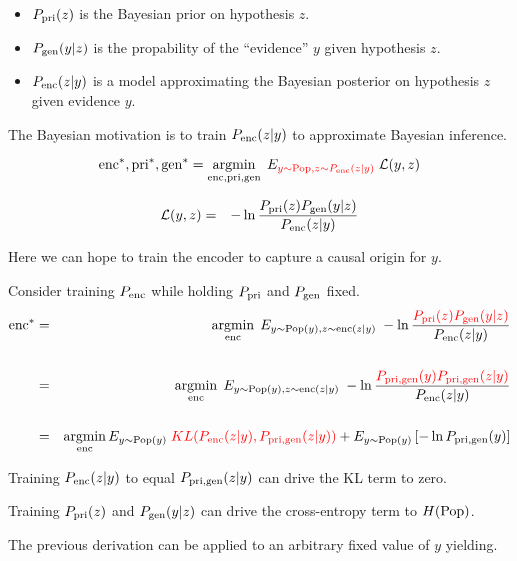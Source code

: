 {\vfill
\begin{itemize}
\item $P_{\mathrm{pri}}(z)$ is the Bayesian prior on hypothesis $z$.

\vfill
\item $P_{\mathrm{gen}}(y|z)$ is the propability of the ``evidence'' $y$ given hypothesis $z$.

\vfill
\item $P_{\mathrm{enc}}(z|y)$ is a model approximating the Bayesian posterior on hypothesis $z$ given evidence $y$.
\end{itemize}

\vfill
The Bayesian motivation is to train $P_{\mathrm{enc}}(z|y)$ to approximate Bayesian inference.


$$\mathrm{enc}^*,\mathrm{pri}^*,\mathrm{gen}^* = \operatorname*{argmin}_{\mathrm{enc},\mathrm{pri},\mathrm{gen}}\;E_{\color{red} y \sim \mathrm{Pop},z\sim P_{\mathrm{enc}}(z|y)}\;{\cal L}(y,z)$$

\vfill
\begin{eqnarray*}
{\cal L}(y,z) & = & - \ln \frac{P_{\mathrm{pri}}(z)P_{\mathrm{gen}}(y|z)}{P_{\mathrm{enc}}(z|y)}
\end{eqnarray*}

\vfill
Here we can hope to train the encoder to capture a causal origin for $y$.


{\huge
Consider training $P_{\mathrm{enc}}$ while holding $P_{\mathrm{pri}}$ and $P_{\mathrm{gen}}$ fixed.
\begin{eqnarray*}
  \mathrm{enc}^* & = & \operatorname*{argmin}_{\mathrm{enc}} \;E_{y \sim \mathrm{Pop}(y),z \sim \mathrm{enc}(z|y)}\; - \ln \frac{\color{red} P_{\mathrm{pri}}(z)P_{\mathrm{gen}}(y|z)}{P_{\mathrm{enc}}(z|y)} \\
  \\
  & = & \operatorname*{argmin}_{\mathrm{enc}} \;E_{y \sim \mathrm{Pop}(y),z \sim \mathrm{enc}(z|y)}\; - \ln \frac{\color{red} P_{\mathrm{pri},\mathrm{gen}}(y)P_{\mathrm{pri},\mathrm{gen}}(z|y)}{P_{\mathrm{enc}}(z|y)} \\
  \\
  &= & \operatorname*{argmin}_{\mathrm{enc}} E_{y \sim \mathrm{Pop}(y)} \; {\color{red} KL(P_{\mathrm{enc}}(z|y),P_{\mathrm{pri},\mathrm{gen}}(z|y))} + E_{y\sim \mathrm{Pop}(y)}\left[-\ln P_{\mathrm{pri},\mathrm{gen}}(y)\right]
  \end{eqnarray*}

\vfill
Training $P_{\mathrm{enc}}(z|y)$ to equal $P_{\mathrm{pri},\mathrm{gen}}(z|y)$ can drive the KL term to zero.

\vfill
Training $P_{\mathrm{pri}}(z)$ and $P_{\mathrm{gen}}(y|z)$ can drive the cross-entropy term to $H(\mathrm{Pop})$.
}



The previous derivation can be applied to an arbitrary fixed value of $y$ yielding.

}
